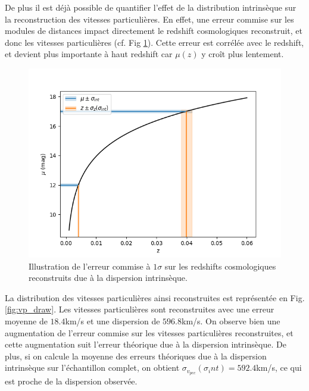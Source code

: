 \documentclass{book}
\begin{document}
De plus il est déjà possible de quantifier l'effet de la distribution intrinsèque sur la reconstruction des vitesses particulières. En effet, une erreur commise sur les modules de distances impact directement le redshift cosmologiques reconstruit, et donc les vitesses particulières (cf. Fig \ref{fig:vp_sigma_int}). Cette erreur est corrélée avec le redshift, et devient plus importante à haut redshift car $\mu(z)$ y croît plus lentement.

\begin{figure}
	\centering
	\includegraphics[width=0.8\linewidth]{figures/sigma_int_effect_vp.png}
	\caption{Illustration de l'erreur commise à $1\sigma$ sur les redshifts cosmologiques reconstruits due à la dispersion intrinsèque.}
	\label{fig:vp_sigma_int}
\end{figure}

La distribution des vitesses particulières ainsi reconstruites est représentée en Fig. \ref{fig:vp_draw}. Les vitesses particulières sont reconstruites avec une erreur moyenne de $18.4$km/s et une dispersion de $596.8$km/s. On observe bien une augmentation de l'erreur commise sur les vitesses particulières reconstruites, et cette augmentation suit l'erreur théorique due à la dispersion intrinsèque. De plus, si on calcule la moyenne des erreurs théoriques due à la dispersion intrinsèque sur l'échantillon complet, on obtient $\sigma_{v_{pec}}(\sigma_int) = 592.4$km/s, ce qui est proche de la dispersion observée.
\end{document}
